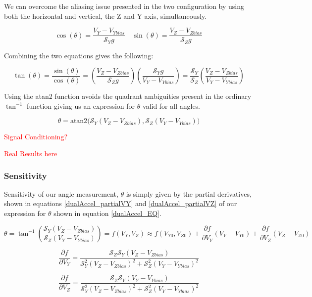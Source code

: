 \documentclass{article}
\newcommand{\xxx}[1]{\textcolor{red}{#1}}
\theoremstyle{plain}
\theoremstyle{definition}
\theoremstyle{remark}
\newcommand{\Sens}{\mathcal{S}}
\begin{document}
We can overcome the aliasing issue  presented in the two configuration by using both the horizontal and vertical, the Z and Y axis, simultaneously.  

$$ \cos(\theta) = \frac{V_Y-V_{Ybias}}{\Sens_{Y} g} \quad \sin(\theta) = \frac{V_{Z} - V_{Zbias}}{\Sens_{Z} g} $$

Combining the two equations gives the following:

$$ \tan(\theta) = \frac{\sin(\theta)}{\cos(\theta)} = \left(\frac{V_{Z} - V_{Zbias}}{\Sens_{Z} g}\right) \left( \frac{\Sens_{Y} g}{V_Y-V_{Ybias}} \right) = \frac{\Sens_{Y}}{\Sens_{Z}} \left( \frac{V_{Z} - V_{Zbias}}{V_{Y} - V_{Ybias}} \right)$$

Using the atan2 function avoids the quadrant ambiguities present in the ordinary $\tan^{-1}$ function giving us an expression for $\theta$ valid for all angles.

$$\theta = \text{atan2}\big( \Sens_{Y} \left( V_{Z} - V_{Zbias}\right),  \Sens_{Z} \left( V_{Y} - V_{Ybias}\right) \big)$$

\xxx{Signal Conditioning?}

\xxx{Real Results here}

\subsubsection{Sensitivity}

Sensitivity of our angle measurement, $\theta$ is simply given by the partial derivatives, shown in equations \ref{dualAccel_partialVY} and \ref{dualAccel_partialVZ} of our expression for $\theta$ shown in equation \ref{dualAccel_EQ}.

\begin{equation}
\theta = \tan^{-1} \left( \frac{\Sens_{Y} \left( V_{Z} - V_{Zbias}\right)}{\Sens_{Z} \left( V_{Y} - V_{Ybias}\right)} \right) = f(V_{Y},V_{Z}) \approx f(V_{Y0},V_{Z0}) + \frac{\partial f}{\partial V_{Y}} \left( V_Y - V_{Y0} \right) + \frac{\partial f}{\partial V_Z} \left( V_Z - V_{Z0}\right)  
\label{dualAccel_EQ}
\end{equation}

\begin{equation}
\frac{\partial f}{\partial V_{Y}} = \frac{\Sens_Z \Sens_Y \left(V_{Z} - V_{Zbias} \right)}{\Sens^2_Y \left(V_Z - V_{Zbias} \right) ^2 + \Sens^2_Z \left( V_Y - V_{Ybias}\right)^2}
\label{dualAccel_partialVY}
\end{equation}

\begin{equation}
\frac{\partial f }{\partial V_Z} = \frac{\Sens_Z \Sens_Y \left(V_{Y} - V_{Ybias} \right)}{\Sens^2_Y \left(V_Z - V_{Zbias} \right) ^2 + \Sens^2_Z \left( V_Y - V_{Ybias}\right)^2}
\label{dualAccel_partialVZ}
\end{equation}
\end{document}
